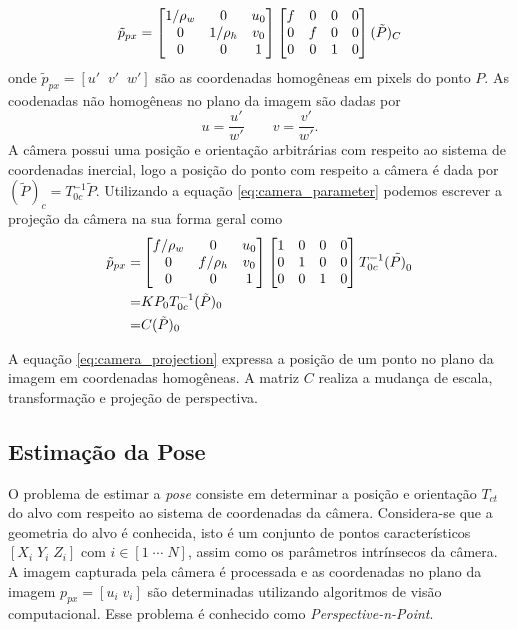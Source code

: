 \begin{equation} \label{eq:camera_parameter}
{\tilde{p}_{px}} = 
\begin{bmatrix}
	1/\rho_w & 0 & u_0 \\
	0        & 1/\rho_h &v_0 \\
	0 & 0 & 1 \\
\end{bmatrix}
\begin{bmatrix} f & 0 & 0 & 0\\
	 0 & f & 0 & 0\\
	 0 & 0 & 1 & 0	
\end{bmatrix}
(\tilde{{P}})_C
\end{equation}
onde $\tilde{p}_{px} = [u' \;\; v' \;\; w']$ são as coordenadas homogêneas em pixels do ponto $P$. As coodenadas não homogêneas no plano da imagem são dadas por
\begin{equation}
u = \frac{u'}{w'} \qquad v = \frac{v'}{w'}.
\end{equation} 
A câmera possui uma posição e orientação arbitrárias com respeito ao sistema de coordenadas inercial, logo a posição do ponto com respeito a câmera é dada por  $({\tilde{P}})_c = {T}_{0c}^{-1} {\tilde{P}}$. Utilizando a equação \eqref{eq:camera_parameter} podemos escrever a projeção da câmera na sua forma geral como
\begin{align}\label{eq:camera_projection}
{\tilde{p}_{px}} =& 
\begin{bmatrix}
	f/\rho_w & 0 & u_0 \\
	0        & f/\rho_h &v_0 \\
	0 & 0 & 1 \\
\end{bmatrix}
\begin{bmatrix}  1 & 0 & 0 & 0\\
	 0 & 1 & 0 & 0\\
	 0 & 0 & 1 & 0	
\end{bmatrix}
{T}_{0c}^{-1} (\tilde{{P})}_0\\
=& {K} {P}_0 {T}_{0c}^{-1} (\tilde{{P}})_0 \\ 
=& {C} ({\tilde{P})_0}
\end{align}

A equação \eqref{eq:camera_projection} expressa a posição de um ponto no plano da imagem em coordenadas homogêneas. A matriz $C$ realiza a mudança de escala, transformação e projeção de perspectiva. 


\subsection{Estimação da Pose}
O problema de estimar a \textit{pose} consiste em determinar a posição e orientação ${T}_{ct}$ do alvo com respeito ao sistema de coordenadas da câmera. Considera-se que a geometria do alvo é conhecida, isto é um conjunto de pontos característicos $[X_i \; Y_i \; Z_i]$ com $i \in [1\; \cdots \; N]$, assim como os parâmetros intrínsecos da câmera. A imagem capturada pela câmera é processada e as coordenadas no plano da imagem $p_{px} = [u_i\; v_i]$ são determinadas utilizando algoritmos de visão computacional. Esse problema é conhecido como \textit{Perspective-n-Point}.

